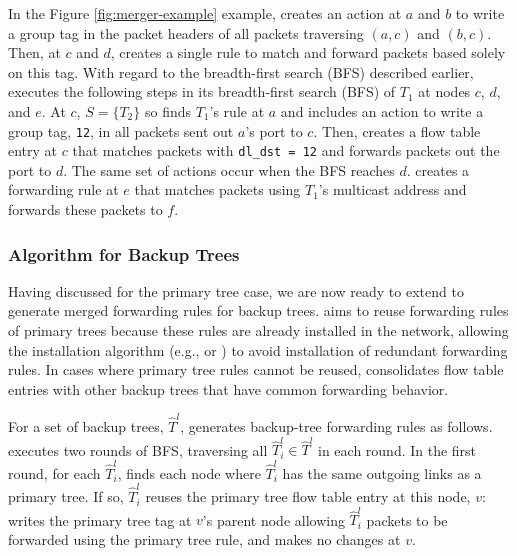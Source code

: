 In the Figure \ref{fig:merger-example} example, \merge  creates an action at $a$ and $b$ to write a group tag in the packet headers of all packets traversing $(a,c)$ and $(b,c)$.
Then, at $c$ and $d$, \merge creates a single rule to match and forward packets based solely on this tag.  With regard to the breadth-first search (BFS) described earlier, 
\merge executes the following steps in  its breadth-first search (BFS) of $T_1$ at nodes $c$, $d$, and $e$.
At $c$, $S=\{T_2\}$ so \merge finds $T_1$'s rule at $a$ and includes an action to write a group tag, {\tt 12}, in all packets sent out $a$'s port to $c$. 
Then, \merge creates a flow table entry at $c$ that matches packets with {\tt dl\_dst = 12} and forwards packets out the port to $d$.  The same set of actions occur when the BFS reaches $d$. 
\merge creates a forwarding rule at $e$ that matches packets using $T_1$'s multicast address and forwards these packets to $f$.



\subsubsection{\mergen Algorithm for Backup Trees}
\label{subsubsec:merge-backup}

Having discussed \merge for the primary tree case, we are now ready to extend \merge to generate merged forwarding rules for backup trees.  \merge 
aims to reuse forwarding rules of primary trees because these rules are already installed in the network, allowing the installation algorithm
(e.g., \pre or \posts) to avoid installation of redundant forwarding rules.  In cases where primary tree rules cannot be reused, \merge consolidates
flow table entries with other backup trees that have common forwarding behavior.

For a set of backup trees, $\hat{T}^l$, \merge generates backup-tree forwarding rules as follows. 
\merge executes two rounds of BFS, traversing all
$\hat{T}^l_i \in \hat{T}^l$ in each round.  In the first round, for each $\hat{T}_i^l$, \merge finds each node where $\hat{T}_i^l$ has the same outgoing links as a primary tree.  
If so, $\hat{T}_i^l$ reuses the primary tree flow table entry at this node, $v$: \merge writes the primary tree tag at $v$'s parent node
allowing $\hat{T}_i^l$ packets to be forwarded using the primary tree rule, and makes no changes at $v$.

